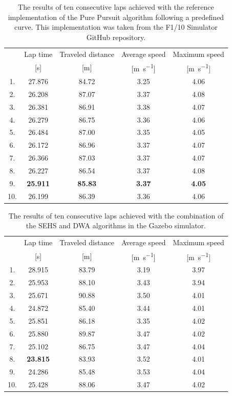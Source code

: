 \begin{table}
	\centering
	\begin{tabular}{c c c c c}
		\toprule
		& Lap time       & Traveled distance  & Average speed             & Maximum speed             \\
		& [\si{\second}] & [\si{\meter}]      & [\si{\meter\per\second}]  & [\si{\meter\per\second}]  \\
		\midrule
		1. & 27.876 & 84.72 & 3.25 & 4.06 \\
		2. & 26.208 & 87.07 & 3.37 & 4.08 \\
		3. & 26.381 & 86.91 & 3.38 & 4.07 \\
		4. & 26.279 & 86.75 & 3.36 & 4.06 \\
		5. & 26.484 & 87.00 & 3.35 & 4.05 \\
		6. & 26.172 & 86.96 & 3.37 & 4.07 \\
		7. & 26.366 & 87.03 & 3.37 & 4.07 \\
		8. & 26.227 & 86.54 & 3.37 & 4.08 \\
		9. & \textbf{25.911} & \textbf{85.83} & \textbf{3.37} & \textbf{4.05} \\
		10. & 26.199 & 86.39 & 3.36 & 4.06 \\
		\bottomrule
	\end{tabular}
	\caption{The results of ten consecutive laps achieved with the reference implementation of the Pure Pursuit algorithm following a predefined curve. This implementation was taken from the F1/10 Simulator GitHub repository.}
	\label{tbl:reference-impl}
\end{table}

\begin{table}
	\centering
	\begin{tabular}{c c c c c}
		\toprule
		    & Lap time       & Traveled distance  & Average speed             & Maximum speed             \\
		    & [\si{\second}] & [\si{\meter}]      & [\si{\meter\per\second}]  & [\si{\meter\per\second}]  \\
		\midrule
		1. & 28.915 & 83.79 & 3.19 & 3.97 \\
		2. & 25.953 & 88.10 & 3.43 & 3.94 \\
		3. & 25.671 & 90.88 & 3.50 & 4.01 \\
		4. & 24.872 & 85.40 & 3.44 & 4.01 \\
		5. & 25.851 & 86.18 & 3.35 & 4.02 \\
		6. & 25.880 & 89.87 & 3.47 & 4.02 \\
		7. & 25.102 & 86.75 & 3.47 & 4.04 \\
		8. & \bfseries 23.815 & 83.93 & 3.52 & 4.01 \\
		9. & 24.286 & 85.48 & 3.53 & 4.04 \\
		10. & 25.428 & 88.06 & 3.47 & 4.02 \\
		\bottomrule
	\end{tabular}
	\caption{The results of ten consecutive laps achieved with the combination of the SEHS and DWA algorithms in the Gazebo simulator.}
	\label{tbl:dwa-sehs}
\end{table}

